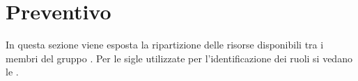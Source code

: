 \section{Preventivo}
In questa sezione viene esposta la ripartizione delle risorse disponibili tra i membri del gruppo \Gruppo{}. Per le sigle utilizzate per l'identificazione dei ruoli si vedano le \NdP{}.




